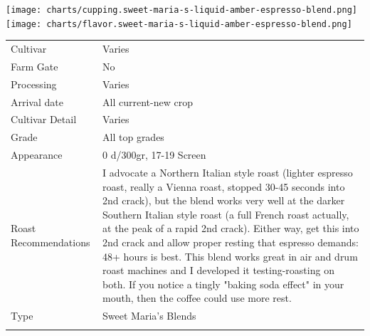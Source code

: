 \documentclass[10pt,twoside,footinclude=true,headinclude=true]{scrbook} %
\newlength{\mysize}
\newcommand{\myfontsize}[1]{
  \setlength{\mysize}{#1pt}
  \fontsize{\mysize}{1.2\mysize}
  \selectfont
}
\begin{document}
\centering
\vspace{2em}
\texttt{[image: charts/cupping.sweet-maria-s-liquid-amber-espresso-blend.png]}
\texttt{[image: charts/flavor.sweet-maria-s-liquid-amber-espresso-blend.png]}

\vspace{1em}
\begin{table}[htbp]
\myfontsize{7}
\hspace*{2.2em}
\begin{tabular}{ >{\raggedleft\arraybackslash}p{3.6cm}!{\color{lightgray}\vrule}p{7cm} }
\hline
  Cultivar & Varies \\
  \hline
  Farm Gate & No \\
  \hline
  Processing & Varies \\
  \hline
  Arrival date & All current-new crop \\
  \hline
  Cultivar Detail & Varies \\
  \hline
  Grade & All top grades \\
  \hline
  Appearance & 0 d/300gr, 17-19 Screen \\
  \hline
  Roast Recommendations & I advocate a Northern Italian style roast (lighter espresso roast, really a Vienna roast, stopped 30-45 seconds into 2nd crack), but the blend works very well at the darker Southern Italian style roast (a full French roast actually, at the peak of a rapid 2nd crack). Either way, get this into 2nd crack and allow proper resting that espresso demands: 48+ hours is best. This blend works great in air and drum roast machines and I developed it testing-roasting on both. If you notice a tingly "baking soda effect" in your mouth, then the coffee could use more rest. \\
  \hline
  Type & Sweet Maria's Blends \\
  \hline

\end{tabular}
\end{table}

\end{document}
